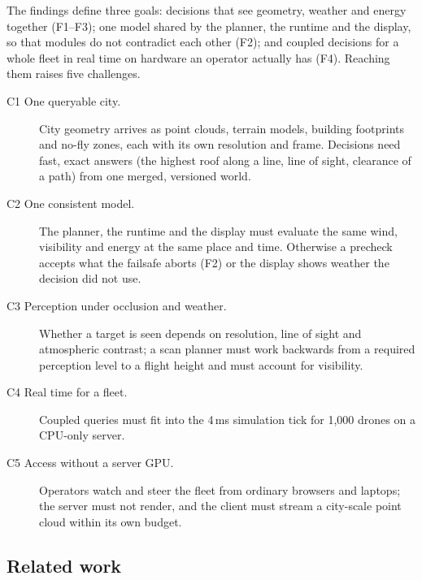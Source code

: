 The findings define three goals: decisions that see geometry, weather and energy together (F1--F3); one model shared by
the planner, the runtime and the display, so that modules do not contradict each other (F2); and coupled decisions for
a whole fleet in real time on hardware an operator actually has (F4). Reaching them raises five challenges.

\begin{description}
\item[C1 One queryable city.] City geometry arrives as point clouds, terrain models, building footprints and no-fly
zones, each with its own resolution and frame. Decisions need fast, exact answers (the highest roof along a line,
line of sight, clearance of a path) from one merged, versioned world.
\item[C2 One consistent model.] The planner, the runtime and the display must evaluate the same wind, visibility and
energy at the same place and time. Otherwise a precheck accepts what the failsafe aborts (F2) or the display shows
weather the decision did not use.
\item[C3 Perception under occlusion and weather.] Whether a target is seen depends on resolution, line of sight and
atmospheric contrast; a scan planner must work backwards from a required perception level to a flight height and
must account for visibility.
\item[C4 Real time for a fleet.] Coupled queries must fit into the 4\,ms simulation tick for 1,000 drones on a
CPU-only server.
\item[C5 Access without a server GPU.] Operators watch and steer the fleet from ordinary browsers and laptops; the
server must not render, and the client must stream a city-scale point cloud within its own budget.
\end{description}

\subsection{Related work}\label{sec:bg:related}

